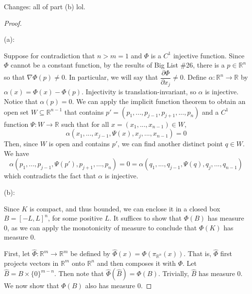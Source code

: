 \documentclass{article}
\theoremstyle{plain} %
\numberwithin{thm}{section} %
\theoremstyle{definition}
\begin{document}
        Changes: all of part (b) lol.
        \color{black}
        \begin{proof}
            \ 
            
            (a):

            Suppose for contradiction that \(n > m = 1\) and \(\Phi\) is a \(C^1\) injective function. Since \(\Phi\) cannot be a constant function, by the results of Big List \#26, there is a \(p \in \mathbb{R}^n\) so that \(\nabla \Phi(p) \neq 0\). In particular, we will say that \(\dfrac{\partial \Phi}{\partial x_j} \neq 0\). Define \(\alpha : \mathbb{R}^n \to \mathbb{R}\) by \(\alpha (x) = \Phi (x) - \Phi (p)\). Injectivity is translation-invariant, so \(\alpha\) is injective. Notice that \(\alpha (p) = 0\). We can apply the implicit function theorem to obtain an open set \(W \subseteq \mathbb{R}^{n-1}\) that contains \(p' = (p_1, ..., p_{j-1}, p_{j+1}, ..., p_n)\) and a \(C^1\) function \(\Psi : W \to \mathbb{R}\) such that for all \(x = (x_1, ..., x_{n-1}) \in W\),
            \[
                \alpha (x_1, ..., x_{j-1}, \Psi (x), x_{j}, ..., x_{n-1}) = 0
            \]
            Then, since \(W\) is open and contains \(p'\), we can find another distinct point \(q \in W\). We have
            \[
                \alpha (p_1, ..., p_{j-1}, \Psi (p'), p_{j+1}, ..., p_n) = 0 = \alpha (q_1, ..., q_{j-1}, \Psi (q), q_{j}, ..., q_{n-1})
            \]
            which contradicts the fact that \(\alpha\) is injective.

            \medskip

            (b):

            Since \(K\) is compact, and thus bounded, we can enclose it in a closed box \(B = [-L, L]^n\), for some positive \(L\). It suffices to show that \(\Phi (B)\) has measure 0, as we can apply the monotonicity of measure to conclude that \(\Phi (K)\) has measure 0.

            First, let \(\hat{\Phi}: \mathbb{R}^m \to \mathbb{R}^m\) be defined by \(\hat{\Phi}(x) = \Phi (\pi _{\mathbb{R}^n}(x))\). That is, \(\hat{\Phi}\) first projects vectors in \(\mathbb{R}^m\) onto \(\mathbb{R}^n\) and then composes it with \(\Phi\). Let \(\hat{B} = B \times \{ 0 \}^{m-n}\). Then note that \(\hat{\Phi}(\hat{B}) = \Phi (B)\). Trivially, \(\hat{B}\) has measure 0. We now show that \(\Phi (B)\) also has measure 0.


\end{proof}
\end{document}
